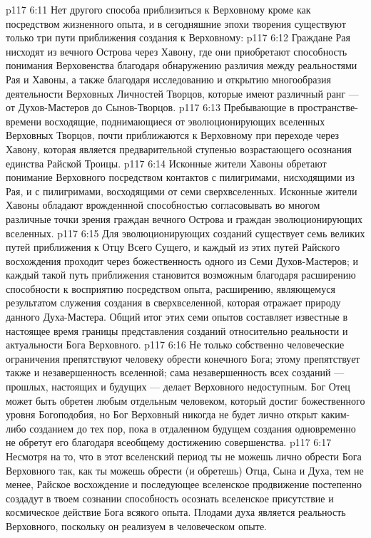 \vs p117 6:11 \pc Нет другого способа приблизиться к Верховному кроме как посредством жизненного опыта, и в сегодняшние эпохи творения существуют только три пути приближения создания к Верховному:
\vs p117 6:12 \bibnobreakspace Граждане Рая нисходят из вечного Острова через Хавону, где они приобретают способность понимания Верховенства благодаря обнаружению различия между реальностями Рая и Хавоны, а также благодаря исследованию и открытию многообразия деятельности Верховных Личностей Творцов, которые имеют различный ранг --- от Духов\hyp{}Мастеров до Сынов\hyp{}Творцов.
\vs p117 6:13 \pc {}\bibnobreakspace Пребывающие в пространстве\hyp{}времени восходящие, поднимающиеся от эволюционирующих вселенных Верховных Творцов, почти приближаются к Верховному при переходе через Хавону, которая является предварительной ступенью возрастающего осознания единства Райской Троицы.
\vs p117 6:14 \pc {}\bibnobreakspace Исконные жители Хавоны обретают понимание Верховного посредством контактов с пилигримами, нисходящими из Рая, и с пилигримами, восходящими от семи сверхвселенных. Исконные жители Хавоны обладают врожденнной способностью согласовывать во многом различные точки зрения граждан вечного Острова и граждан эволюционирующих вселенных.
\vs p117 6:15 \pc Для эволюционирующих созданий существует семь великих путей приближения к Отцу Всего Сущего, и каждый из этих путей Райского восхождения проходит через божественность одного из Семи Духов\hyp{}Мастеров; и каждый такой путь приближения становится возможным благодаря расширению способности к восприятию посредством опыта, расширению, являющемуся результатом служения создания в сверхвселенной, которая отражает природу данного Духа\hyp{}Мастера. Общий итог этих семи опытов составляет известные в настоящее время границы представления созданий относительно реальности и актуальности Бога Верховного.
\vs p117 6:16 Не только собственно человеческие ограничения препятствуют человеку обрести конечного Бога; этому препятствует также и незавершенность вселенной; сама незавершенность всех созданий --- прошлых, настоящих и будущих --- делает Верховного недоступным. Бог Отец может быть обретен любым отдельным человеком, который достиг божественного уровня Богоподобия, но Бог Верховный никогда не будет лично открыт каким\hyp{}либо  созданием до тех пор, пока в отдаленном будущем  создания одновременно не обретут его благодаря всеобщему достижению совершенства.
\vs p117 6:17 Несмотря на то, что в этот вселенский период ты не можешь лично обрести Бога Верховного так, как ты можешь обрести (и обретешь) Отца, Сына и Духа, тем не менее, Райское восхождение и последующее вселенское продвижение постепенно создадут в твоем сознании способность осознать вселенское присутствие и космическое действие Бога всякого опыта. Плодами духа является реальность Верховного, поскольку он реализуем в человеческом опыте.
